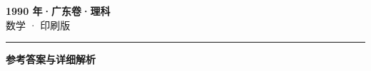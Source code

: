 \documentclass[zihao=5, a4paper]{ctexart}
\begin{document}
\begin{center}
  {\Large\bfseries 1990 年·广东卷·理科}\\[4pt]
  {\large 数学 · 印刷版}
\end{center}
\medskip
{}

\par\bigskip\hrule\bigskip
{}
\begin{center}{\large\bfseries 参考答案与详细解析}\end{center}
\smallskip

\end{document}
